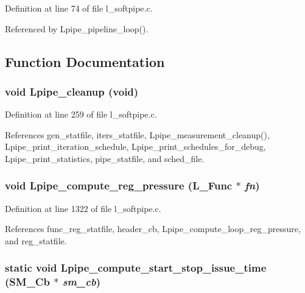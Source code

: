 Definition at line 74 of file l\_\-softpipe.c.

Referenced by Lpipe\_\-pipeline\_\-loop().

\subsection{Function Documentation}
\subsubsection{\setlength{\rightskip}{0pt plus 5cm}void Lpipe\_\-cleanup (void)}\label{l__softpipe_8c_5f4f86dea88858861446d1e06c1dea15}




Definition at line 259 of file l\_\-softpipe.c.

References gen\_\-statfile, iters\_\-statfile, Lpipe\_\-measurement\_\-cleanup(), Lpipe\_\-print\_\-iteration\_\-schedule, Lpipe\_\-print\_\-schedules\_\-for\_\-debug, Lpipe\_\-print\_\-statistics, pipe\_\-statfile, and sched\_\-file.
\subsubsection{\setlength{\rightskip}{0pt plus 5cm}void Lpipe\_\-compute\_\-reg\_\-pressure (L\_\-Func $\ast$ {\em fn})}\label{l__softpipe_8c_432bc19bba68265dd93532edc814fcff}




Definition at line 1322 of file l\_\-softpipe.c.

References func\_\-reg\_\-statfile, header\_\-cb, Lpipe\_\-compute\_\-loop\_\-reg\_\-pressure, and reg\_\-statfile.
\subsubsection{\setlength{\rightskip}{0pt plus 5cm}static void Lpipe\_\-compute\_\-start\_\-stop\_\-issue\_\-time (\bf{SM\_\-Cb} $\ast$ {\em sm\_\-cb})\hspace{0.3cm}{\tt  [static]}}\label{l__softpipe_8c_950faa312298324e1d5634c3c4842ae1}




